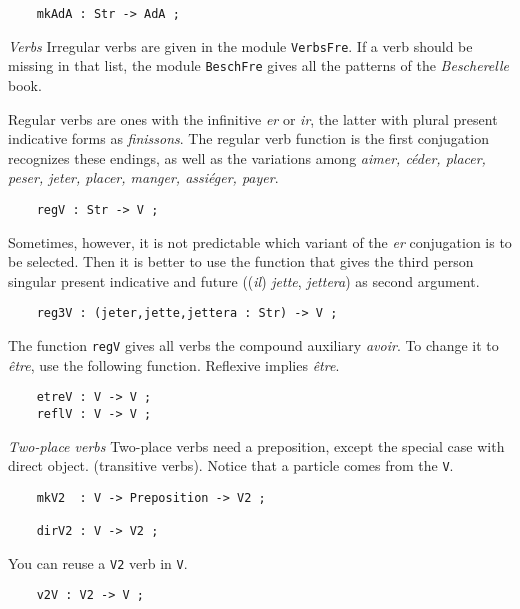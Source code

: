 \documentclass[11pt,a4paper]{article}
\newcommand{\subsubsubsection}[1]{\textit{#1}}
\begin{document}
\begin{verbatim}
    mkAdA : Str -> AdA ;
\end{verbatim}

\subsubsubsection{Verbs}
Irregular verbs are given in the module \texttt{VerbsFre}. 
If a verb should be missing in that list, the module
\texttt{BeschFre} gives all the patterns of the \textit{Bescherelle} book.

Regular verbs are ones with the infinitive \textit{er} or \textit{ir}, the
latter with plural present indicative forms as \textit{finissons}.
The regular verb function is the first conjugation recognizes
these endings, as well as the variations among
\textit{aimer, céder, placer, peser, jeter, placer, manger, assiéger, payer}.

\begin{verbatim}
    regV : Str -> V ;
\end{verbatim}

Sometimes, however, it is not predictable which variant of the \textit{er}
conjugation is to be selected. Then it is better to use the function
that gives the third person singular present indicative and future 
((\textit{il}) \textit{jette}, \textit{jettera}) as second argument.

\begin{verbatim}
    reg3V : (jeter,jette,jettera : Str) -> V ;
\end{verbatim}

The function \texttt{regV} gives all verbs the compound auxiliary \textit{avoir}.
To change it to \textit{être}, use the following function. Reflexive implies \textit{être}.

\begin{verbatim}
    etreV : V -> V ;
    reflV : V -> V ;
\end{verbatim}

\subsubsubsection{Two-place verbs}
Two-place verbs need a preposition, except the special case with direct object.
(transitive verbs). Notice that a particle comes from the \texttt{V}.

\begin{verbatim}
    mkV2  : V -> Preposition -> V2 ;
  
    dirV2 : V -> V2 ;
\end{verbatim}

You can reuse a \texttt{V2} verb in \texttt{V}.

\begin{verbatim}
    v2V : V2 -> V ;
\end{verbatim}
\end{document}
